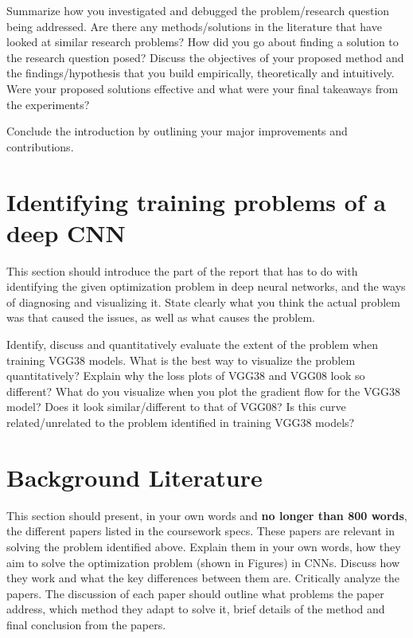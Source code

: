 \documentclass{article}
\begin{document}
Summarize how you investigated and debugged the problem/research question being addressed. Are there any methods/solutions in the literature that have looked at similar research problems? How did you go about finding a solution to the research question posed? Discuss the objectives of your proposed method and the findings/hypothesis that you build empirically, theoretically and intuitively. Were your proposed solutions effective and what were your final takeaways from the experiments? 

Conclude the introduction by outlining your major improvements and contributions.



\section{Identifying training problems of a deep CNN}

This section should introduce the  part of the report that has to do with identifying the given optimization problem in deep neural networks, and the ways of diagnosing and visualizing it. State clearly what you think the actual problem was that caused the issues, as well as what causes the problem. 

Identify, discuss and quantitatively evaluate the extent of the problem when training VGG38 models. What is the best way to visualize the problem quantitatively? Explain why the loss plots of VGG38 and VGG08 look so different? What do you visualize when you plot the gradient flow for the VGG38 model? Does it look similar/different to that of VGG08? Is this curve related/unrelated to the problem identified in training VGG38 models?

\section{Background Literature}

This section should present, in your own words and \textbf{no longer than 800 words}, the different papers listed in the coursework specs. These papers are relevant in solving the problem identified above. Explain them in your own words, how they aim to solve the optimization problem (shown in Figures) in CNNs. Discuss how they work and what the key differences between them are. Critically analyze the papers. The discussion of each paper should outline what problems the paper address, which method they adapt to solve it, brief details of the method and final conclusion from the papers. 
\end{document}
